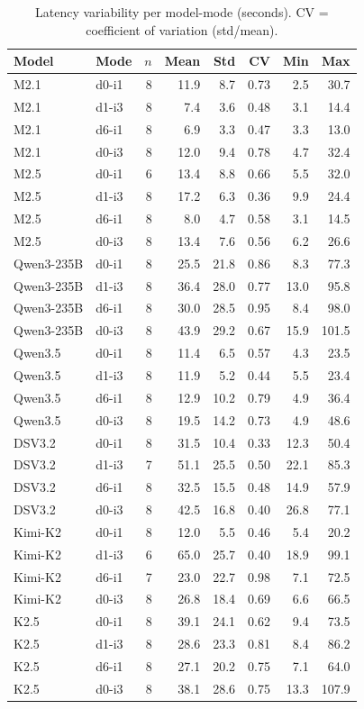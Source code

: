 \begin{table}[t]
\centering
\caption{Latency variability per model-mode (seconds). CV = coefficient of variation (std/mean).}
\label{tab:latency-variability}
\begin{tabular}{llrrrrrr}
\toprule
Model & Mode & $n$ & Mean & Std & CV & Min & Max \\
\midrule
  M2.1 & d0-i1 & 8 & 11.9 & 8.7 & 0.73 & 2.5 & 30.7 \\
  M2.1 & d1-i3 & 8 & 7.4 & 3.6 & 0.48 & 3.1 & 14.4 \\
  M2.1 & d6-i1 & 8 & 6.9 & 3.3 & 0.47 & 3.3 & 13.0 \\
  M2.1 & d0-i3 & 8 & 12.0 & 9.4 & 0.78 & 4.7 & 32.4 \\
  M2.5 & d0-i1 & 6 & 13.4 & 8.8 & 0.66 & 5.5 & 32.0 \\
  M2.5 & d1-i3 & 8 & 17.2 & 6.3 & 0.36 & 9.9 & 24.4 \\
  M2.5 & d6-i1 & 8 & 8.0 & 4.7 & 0.58 & 3.1 & 14.5 \\
  M2.5 & d0-i3 & 8 & 13.4 & 7.6 & 0.56 & 6.2 & 26.6 \\
  Qwen3-235B & d0-i1 & 8 & 25.5 & 21.8 & 0.86 & 8.3 & 77.3 \\
  Qwen3-235B & d1-i3 & 8 & 36.4 & 28.0 & 0.77 & 13.0 & 95.8 \\
  Qwen3-235B & d6-i1 & 8 & 30.0 & 28.5 & 0.95 & 8.4 & 98.0 \\
  Qwen3-235B & d0-i3 & 8 & 43.9 & 29.2 & 0.67 & 15.9 & 101.5 \\
  Qwen3.5 & d0-i1 & 8 & 11.4 & 6.5 & 0.57 & 4.3 & 23.5 \\
  Qwen3.5 & d1-i3 & 8 & 11.9 & 5.2 & 0.44 & 5.5 & 23.4 \\
  Qwen3.5 & d6-i1 & 8 & 12.9 & 10.2 & 0.79 & 4.9 & 36.4 \\
  Qwen3.5 & d0-i3 & 8 & 19.5 & 14.2 & 0.73 & 4.9 & 48.6 \\
  DSV3.2 & d0-i1 & 8 & 31.5 & 10.4 & 0.33 & 12.3 & 50.4 \\
  DSV3.2 & d1-i3 & 7 & 51.1 & 25.5 & 0.50 & 22.1 & 85.3 \\
  DSV3.2 & d6-i1 & 8 & 32.5 & 15.5 & 0.48 & 14.9 & 57.9 \\
  DSV3.2 & d0-i3 & 8 & 42.5 & 16.8 & 0.40 & 26.8 & 77.1 \\
  Kimi-K2 & d0-i1 & 8 & 12.0 & 5.5 & 0.46 & 5.4 & 20.2 \\
  Kimi-K2 & d1-i3 & 6 & 65.0 & 25.7 & 0.40 & 18.9 & 99.1 \\
  Kimi-K2 & d6-i1 & 7 & 23.0 & 22.7 & 0.98 & 7.1 & 72.5 \\
  Kimi-K2 & d0-i3 & 8 & 26.8 & 18.4 & 0.69 & 6.6 & 66.5 \\
  K2.5 & d0-i1 & 8 & 39.1 & 24.1 & 0.62 & 9.4 & 73.5 \\
  K2.5 & d1-i3 & 8 & 28.6 & 23.3 & 0.81 & 8.4 & 86.2 \\
  K2.5 & d6-i1 & 8 & 27.1 & 20.2 & 0.75 & 7.1 & 64.0 \\
  K2.5 & d0-i3 & 8 & 38.1 & 28.6 & 0.75 & 13.3 & 107.9 \\
\bottomrule
\end{tabular}
\end{table}

